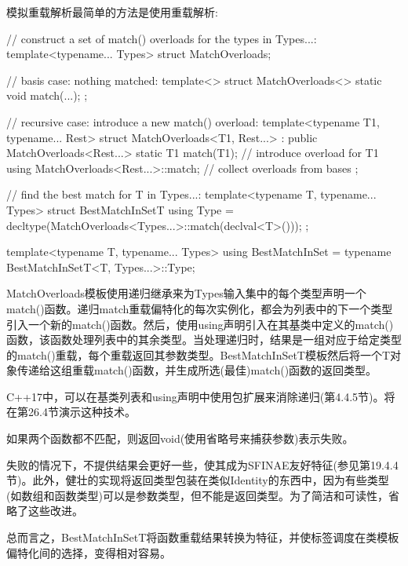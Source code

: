 模拟重载解析最简单的方法是使用重载解析:

\begin{cpp}
// construct a set of match() overloads for the types in Types...:
template<typename... Types>
struct MatchOverloads;

// basis case: nothing matched:
template<>
struct MatchOverloads<> {
	static void match(...);
};

// recursive case: introduce a new match() overload:
template<typename T1, typename... Rest>
struct MatchOverloads<T1, Rest...> : public MatchOverloads<Rest...> {
	static T1 match(T1); // introduce overload for T1
	using MatchOverloads<Rest...>::match; // collect overloads from bases
};

// find the best match for T in Types...:
template<typename T, typename... Types>
struct BestMatchInSetT {
	using Type = decltype(MatchOverloads<Types...>::match(declval<T>()));
};

template<typename T, typename... Types>
using BestMatchInSet = typename BestMatchInSetT<T, Types...>::Type;
\end{cpp}

MatchOverloads模板使用递归继承来为Types输入集中的每个类型声明一个match()函数。递归match重载偏特化的每次实例化，都会为列表中的下一个类型引入一个新的match()函数。然后，使用using声明引入在其基类中定义的match()函数，该函数处理列表中的其余类型。当处理递归时，结果是一组对应于给定类型的match()重载，每个重载返回其参数类型。BestMatchInSetT模板然后将一个T对象传递给这组重载match()函数，并生成所选(最佳)match()函数的返回类型。

\begin{notice}C++17中，可以在基类列表和using声明中使用包扩展来消除递归(第4.4.5节)。将在第26.4节演示这种技术。
\end{notice}

如果两个函数都不匹配，则返回void(使用省略号来捕获参数)表示失败。

\begin{notice}失败的情况下，不提供结果会更好一些，使其成为SFINAE友好特征(参见第19.4.4节)。此外，健壮的实现将返回类型包装在类似Identity的东西中，因为有些类型(如数组和函数类型)可以是参数类型，但不能是返回类型。为了简洁和可读性，省略了这些改进。
\end{notice}

总而言之，BestMatchInSetT将函数重载结果转换为特征，并使标签调度在类模板偏特化间的选择，变得相对容易。










